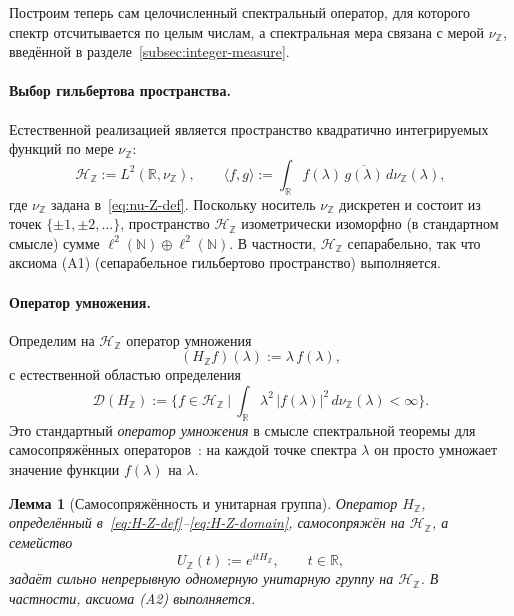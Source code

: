 \documentclass{article}
\numberwithin{equation}{section}
\theoremstyle{plain}
\newtheorem{lemma}{Лемма}
\theoremstyle{definition}
\theoremstyle{remark}
\def\infty{∞}\def\partial{∂}\def\sum{Σ}\def\int{∫}%
\begin{document}
\noindent
Построим теперь сам целочисленный спектральный оператор, для которого
спектр отсчитывается по целым числам, а спектральная мера связана
с мерой \(\nu_{\mathbb Z}\), введённой в разделе~\ref{subsec:integer-measure}.

\paragraph{Выбор гильбертова пространства.}
Естественной реализацией является пространство квадратично интегрируемых
функций по мере \(\nu_{\mathbb Z}\):
\begin{equation}
\label{eq:H-Z-space}
\mathcal H_{\mathbb Z}
:= L^2(\mathbb R,\nu_{\mathbb Z}),
\qquad
\langle f,g\rangle
:= \int_{\mathbb R} f(\lambda)\,\overline{g(\lambda)}\,d\nu_{\mathbb Z}(\lambda),
\end{equation}
где \(\nu_{\mathbb Z}\) задана в~\eqref{eq:nu-Z-def}. Поскольку носитель \(\nu_{\mathbb Z}\)
дискретен и состоит из точек \(\{\pm 1,\pm 2,\dots\}\), пространство
\(\mathcal H_{\mathbb Z}\) изометрически изоморфно (в стандартном смысле) сумме
\(\ell^2(\mathbb N)\oplus\ell^2(\mathbb N)\). В частности, \(\mathcal H_{\mathbb Z}\) сепарабельно,
так что аксиома \textup{(A1)} (сепарабельное гильбертово пространство) выполняется.

\paragraph{Оператор умножения.}
Определим на \(\mathcal H_{\mathbb Z}\) оператор умножения
\begin{equation}
\label{eq:H-Z-def}
(H_{\mathbb Z} f)(\lambda)
:= \lambda\,f(\lambda),
\end{equation}
с естественной областью определения
\begin{equation}
\label{eq:H-Z-domain}
\mathcal D(H_{\mathbb Z})
:= \Big\{ f\in\mathcal H_{\mathbb Z}\ \Big|\ 
\int_{\mathbb R} \lambda^2\,|f(\lambda)|^2\,d\nu_{\mathbb Z}(\lambda)<\infty\Big\}.
\end{equation}
Это стандартный \emph{оператор умножения} в смысле спектральной теоремы
для самосопряжённых операторов~\cite{DunfordSchwartzII,ReedSimonI}: на
каждой точке спектра \(\lambda\) он просто умножает значение функции \(f(\lambda)\)
на \(\lambda\).

\begin{lemma}[Самосопряжённость и унитарная группа]
\label{lem:H-Z-selfadjoint}
Оператор \(H_{\mathbb Z}\), определённый в~\eqref{eq:H-Z-def}–\eqref{eq:H-Z-domain},
самосопряжён на \(\mathcal H_{\mathbb Z}\), а семейство
\begin{equation}
\label{eq:U-Z-def}
U_{\mathbb Z}(t)
:= e^{it H_{\mathbb Z}},\qquad t\in\mathbb R,
\end{equation}
задаёт сильно непрерывную одномерную унитарную группу на \(\mathcal H_{\mathbb Z}\).
В частности, аксиома \textup{(A2)} выполняется.
\end{lemma}
\end{document}
